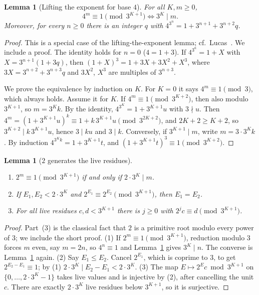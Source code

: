 \documentclass[11pt,reqno,oneside]{amsart}
\theoremstyle{plain}
\newtheorem{lemma}[theorem]{Lemma}
\theoremstyle{definition}
\numberwithin{equation}{section}
\begin{document}
\begin{lemma}[Lifting the exponent for base $4$]\label{lem:lte}
For all $K,m\ge 0$,
\[
4^m\equiv 1\pmod{3^{K+1}}\iff 3^K\mid m.
\]
Moreover, for every $n\ge 0$ there is an integer $q$ with $4^{3^n}=1+3^{n+1}+3^{n+2}q$.
\end{lemma}
\begin{proof}
This is a special case of the lifting-the-exponent lemma; cf.\ Lucas~\cite{Lucas78}. We include a proof. The identity holds for $n=0$ ($4=1+3$). If $4^{3^n}=1+X$ with $X=3^{n+1}(1+3q)$, then $(1+X)^3=1+3X+3X^2+X^3$, where $3X=3^{n+2}+3^{n+3}q$ and $3X^2$, $X^3$ are multiples of $3^{n+3}$.

We prove the equivalence by induction on $K$. For $K=0$ it says $4^m\equiv1\pmod 3$, which always holds. Assume it for $K$. If $4^m\equiv1\pmod{3^{K+2}}$, then also modulo $3^{K+1}$, so $m=3^Kk$. By the identity, $4^{3^K}=1+3^{K+1}u$ with $3\nmid u$. Then $4^m=(1+3^{K+1}u)^k\equiv 1+k\,3^{K+1}u\pmod{3^{2K+2}}$, and $2K+2\ge K+2$, so $3^{K+2}\mid k\,3^{K+1}u$, hence $3\mid ku$ and $3\mid k$. Conversely, if $3^{K+1}\mid m$, write $m=3\cdot 3^Kk$. By induction $4^{3^Kk}=1+3^{K+1}t$, and $(1+3^{K+1}t)^3\equiv1\pmod{3^{K+2}}$.
\end{proof}

\begin{lemma}[$2$ generates the live residues]\label{lem:two_gen}
\leavevmode
\begin{enumerate}[label=(\arabic*), leftmargin=1.8em]
\item $2^m\equiv1\pmod{3^{K+1}}$ if and only if $2\cdot3^K\mid m$.
\item If $E_1,E_2<2\cdot3^K$ and $2^{E_1}\equiv2^{E_2}\pmod{3^{K+1}}$, then $E_1=E_2$.
\item For all live residues $c,d<3^{K+1}$ there is $j\ge0$ with $2^jc\equiv d\pmod{3^{K+1}}$.
\end{enumerate}
\end{lemma}
\begin{proof}
Part~(3) is the classical fact that $2$ is a primitive root modulo every power of $3$; we include the short proof. (1) If $2^m\equiv 1\pmod{3^{K+1}}$, reduction modulo $3$ forces $m$ even, say $m=2n$, so $4^n\equiv1$ and Lemma~\ref{lem:lte} gives $3^K\mid n$. The converse is Lemma~\ref{lem:lte} again. (2) Say $E_1\le E_2$. Cancel $2^{E_1}$, which is coprime to $3$, to get $2^{E_2-E_1}\equiv1$; by (1) $2\cdot 3^K\mid E_2-E_1<2\cdot3^K$. (3) The map $E\mapsto 2^Ec\bmod 3^{K+1}$ on $\{0,\dots,2\cdot3^K-1\}$ takes live values and is injective by (2), after cancelling the unit $c$. There are exactly $2\cdot3^K$ live residues below $3^{K+1}$, so it is surjective.
\end{proof}
\end{document}
